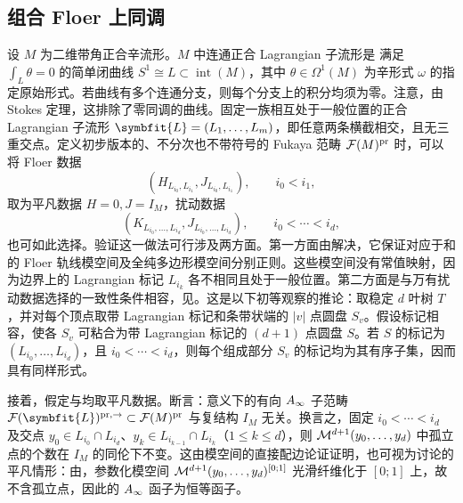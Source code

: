 \subsection{组合 Floer 上同调}\label{sec:13b}
设 $M$ 为二维带角正合辛流形。$M$ 中连通正合 Lagrangian 子流形是
满足 $\int_L\theta=0$ 的简单闭曲线 $S^1\cong L\subset\operatorname{int}(M)$，其中 $\theta\in\Omega^1(M)$ 为辛形式 $\omega$ 的指定原始形式。若曲线有多个连通分支，则每个分支上的积分均须为零。注意，由 Stokes 定理，这排除了零同调的曲线。固定一族相互处于一般位置的正合 Lagrangian 子流形 $\symbfit{L}=(L_1,\allowbreak \ldots,\allowbreak L_m)$，即任意两条横截相交，且无三重交点。定义初步版本的、不分次也不带符号的 Fukaya 范畴 $\mathcal F(M)^{\mathrm{pr}}$ 时，可以将 Floer 数据
\begin{equation}\label{eq:13.4}
(H_{L_{i_0},L_{i_1}},J_{L_{i_0},L_{i_1}}),\qquad i_0<i_1,
\end{equation}
取为平凡数据 $H=0,\allowbreak J=I_M$，扰动数据
\begin{equation}\label{eq:13.5}
(K_{L_{i_0},\ldots,L_{i_d}},J_{L_{i_0},\ldots,L_{i_d}}),\qquad i_0<\cdots<i_d,
\end{equation}
也可如此选择。验证这一做法可行涉及两方面。第一方面由解决，它保证对应于和的 Floer 轨线模空间及全纯多边形模空间分别正则。这些模空间没有常值映射，因为边界上的 Lagrangian 标记 $L_{i_k}$ 各不相同且处于一般位置。第二方面是与万有扰动数据选择的一致性条件相容，见。这是以下初等观察的推论：取稳定 $d$ 叶树 $T$，并对每个顶点取带 Lagrangian 标记和条带状端的 $|v|$ 点圆盘 $S_v$。假设标记相容，使各 $S_v$ 可粘合为带 Lagrangian 标记的 $(d+1)$ 点圆盘 $S$。若 $S$ 的标记为 $(L_{i_0},\allowbreak \ldots,\allowbreak L_{i_d})$，且 $i_0<\cdots<i_d$，则每个组成部分 $S_v$ 的标记均为其有序子集，因而具有同样形式。

接着，假定与均取平凡数据。断言：意义下的有向 $A_\infty$ 子范畴 $\F(\symbfit{L})^{\mathrm{pr},\allowbreak \to}\subset\F(M)^{\mathrm{pr}}$ 与复结构 $I_M$ 无关。换言之，固定 $i_0<\cdots<i_d$ 及交点 $y_0\in L_{i_0}\cap L_{i_d}$、$y_k\in L_{i_{k-1}}\cap L_{i_k}$（$1\leq k\leq d$），则 $\mathcal M^{d+1}(y_0,\allowbreak \ldots,\allowbreak y_d)$ 中孤立点的个数在 $I_M$ 的同伦下不变。这由模空间的直接配边论证证明，也可视为讨论的平凡情形：由，参数化模空间 $\mathcal M^{d+1}(y_0,\allowbreak \ldots,\allowbreak y_d)^{[0;1]}$ 光滑纤维化于 $[0;1]$ 上，故不含孤立点，因此的 $A_\infty$ 函子为恒等函子。

